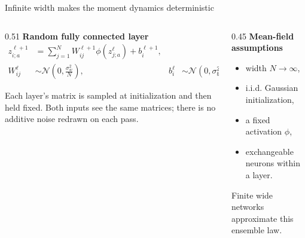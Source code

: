 \documentclass[aspectratio=169,10pt]{beamer}
\begin{document}
\begin{frame}{Infinite width makes the moment dynamics deterministic}
  \begingroup
  \small
  \begin{columns}[T,onlytextwidth]
    \begin{column}{0.51\textwidth}
      {\color{forest}\bfseries Random fully connected layer}
      \begin{align*}
        z_{i;a}^{\ell+1}
          &=\sum_{j=1}^{N}W_{ij}^{\ell+1}
            \phi\!\left(z_{j;a}^{\ell}\right)+b_i^{\ell+1},\\
        W_{ij}^{\ell}&\sim\mathcal N\!\left(0,\frac{\sigma_w^2}{N}\right),
        &b_i^{\ell}&\sim\mathcal N(0,\sigma_b^2).
      \end{align*}

      \vspace{0.15em}
      Each layer's matrix is sampled at initialization and then held fixed. Both inputs see the same matrices; there is no additive noise redrawn on each pass.
    \end{column}

    \begin{column}{0.45\textwidth}
      {\color{forest}\bfseries Mean-field assumptions}
      \begin{itemize}
        \setlength{\itemsep}{0.45em}
        \item width \(N\to\infty\),
        \item i.i.d. Gaussian initialization,
        \item a fixed activation \(\phi\),
        \item exchangeable neurons within a layer.
      \end{itemize}

      \vspace{0.35em}
      {\color{muted}Finite wide networks approximate this ensemble law.}
    \end{column}
  \end{columns}

  \vspace{0.40em}
  \begin{center}
  \end{center}


\end{frame}
\end{document}
